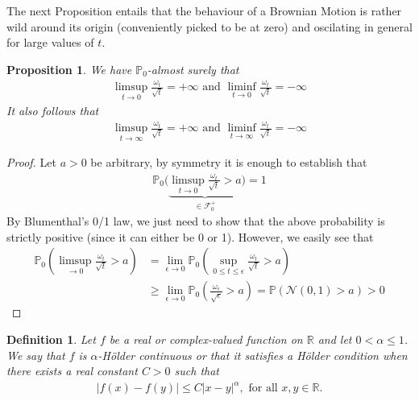 \documentclass[11pt,a4paper, final]{article}
\newtheorem{prop}{Proposition}[section]
\newtheorem{defn}{Definition}[section]
\theoremstyle{definition}
\begin{document}
\noindent The next Proposition entails that the behaviour of a Brownian Motion is rather wild around its origin (conveniently picked to be at zero) and oscilating in general for large values of $t$. 
\begin{prop} We have $\mathbb{P}_0$-almost surely that 
\begin{align*}
\limsup_{t \to 0} \frac{\omega_t}{\sqrt{t}} = + \infty \text{ and } \liminf_{t \to 0} \frac{\omega_t}{\sqrt{t}}= - \infty
\end{align*}
It also follows that 
\begin{align*}
\limsup_{t \to \infty}  \frac{\omega_t}{\sqrt{t}}= + \infty \text{ and } \liminf_{t \to \infty} \frac{\omega_t}{\sqrt{t}} = - \infty 
\end{align*}
\end{prop}
\begin{proof}
Let $a >0$ be arbitrary, by symmetry it is enough to establish that 
\begin{align*}
\mathbb{P}_0 \Big( \underbrace{\limsup_{t \to 0} \frac{\omega_t}{\sqrt{t}} > a}_{ \in \mathcal{F}_0^+} \Big) = 1
\end{align*}
By Blumenthal's 0/1 law, we just need to show that the above probability is strictly positive (since it can either be 0 or 1). However, we easily see that 
\begin{align*}
\mathbb{P}_0 \left( \limsup_{ \to 0} \frac{\omega_t}{\sqrt{t}} > a \right) & = \lim_{ \epsilon \to 0} \mathbb{P}_0 \left( \sup_{0 \leq t \leq \epsilon} \frac{\omega_t}{\sqrt{t}} >a \right) \\
& \geq \lim_{ \epsilon \to 0 } \mathbb{P}_0 \left( \frac{\omega_\epsilon}{\sqrt{\epsilon}} > a \right) = \mathbb{P}( \mathcal{N}(0,1) >a)>0 
\end{align*}
\end{proof}
\newpage
\begin{defn} Let $f$ be a real or complex-valued function on $\mathbb{R}$ and let $ 0 < \alpha \leq 1$. We say that $f$ is $\alpha$-Hölder continuous or that it satisfies a Hölder condition when there exists a real constant $C>0$ such that  
\begin{align*}
|f(x)-f(y)| \leq C |x-y|^\alpha, \text{ for all } x ,y \in \mathbb{R}.
\end{align*}
\end{defn}
\end{document}
